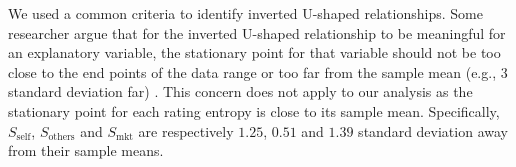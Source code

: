 \documentclass[mnsc,blindrev]{informs3}
\begin{document}
	
	We used a common criteria to identify inverted U-shaped relationships.  Some researcher argue that for the inverted U-shaped relationship to be meaningful for an explanatory variable, the stationary point for that variable should not be too close to the end points of the data range or too far from the sample mean (e.g., 3 standard deviation far) \citep{lind2010or}. This concern does not apply to our analysis as the stationary point for each rating entropy is close to its sample mean. Specifically, $S_{\text{self}}$, $S_{\text{others}}$ and $S_{\text{mkt}}$ are respectively $1.25$, $0.51$ and $1.39$ standard deviation away from their sample means.
	
	
	
	
	
	
	
	
	
\end{document}
